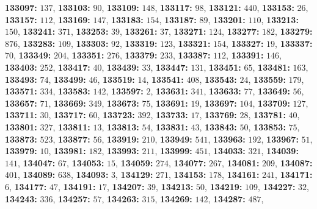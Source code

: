 \textsf{\bfseries 133097:} $137$, \textsf{\bfseries 133103:} $90$, \textsf{\bfseries 133109:} $148$, \textsf{\bfseries 133117:} $98$, \textsf{\bfseries 133121:} $440$, \textsf{\bfseries 133153:} $26$, \textsf{\bfseries 133157:} $112$, \textsf{\bfseries 133169:} $147$, \textsf{\bfseries 133183:} $154$, \textsf{\bfseries 133187:} $89$, \textsf{\bfseries 133201:} $110$, \textsf{\bfseries 133213:} $150$, \textsf{\bfseries 133241:} $371$, \textsf{\bfseries 133253:} $39$, \textsf{\bfseries 133261:} $37$, \textsf{\bfseries 133271:} $124$, \textsf{\bfseries 133277:} $182$, \textsf{\bfseries 133279:} $876$, \textsf{\bfseries 133283:} $109$, \textsf{\bfseries 133303:} $92$, \textsf{\bfseries 133319:} $123$, \textsf{\bfseries 133321:} $154$, \textsf{\bfseries 133327:} $19$, \textsf{\bfseries 133337:} $70$, \textsf{\bfseries 133349:} $204$, \textsf{\bfseries 133351:} $276$, \textsf{\bfseries 133379:} $233$, \textsf{\bfseries 133387:} $112$, \textsf{\bfseries 133391:} $146$, \textsf{\bfseries 133403:} $252$, \textsf{\bfseries 133417:} $40$, \textsf{\bfseries 133439:} $33$, \textsf{\bfseries 133447:} $131$, \textsf{\bfseries 133451:} $65$, \textsf{\bfseries 133481:} $163$, \textsf{\bfseries 133493:} $74$, \textsf{\bfseries 133499:} $46$, \textsf{\bfseries 133519:} $14$, \textsf{\bfseries 133541:} $408$, \textsf{\bfseries 133543:} $24$, \textsf{\bfseries 133559:} $179$, \textsf{\bfseries 133571:} $334$, \textsf{\bfseries 133583:} $142$, \textsf{\bfseries 133597:} $2$, \textsf{\bfseries 133631:} $341$, \textsf{\bfseries 133633:} $77$, \textsf{\bfseries 133649:} $56$, \textsf{\bfseries 133657:} $71$, \textsf{\bfseries 133669:} $349$, \textsf{\bfseries 133673:} $75$, \textsf{\bfseries 133691:} $19$, \textsf{\bfseries 133697:} $104$, \textsf{\bfseries 133709:} $127$, \textsf{\bfseries 133711:} $30$, \textsf{\bfseries 133717:} $60$, \textsf{\bfseries 133723:} $392$, \textsf{\bfseries 133733:} $17$, \textsf{\bfseries 133769:} $28$, \textsf{\bfseries 133781:} $40$, \textsf{\bfseries 133801:} $327$, \textsf{\bfseries 133811:} $13$, \textsf{\bfseries 133813:} $54$, \textsf{\bfseries 133831:} $43$, \textsf{\bfseries 133843:} $50$, \textsf{\bfseries 133853:} $75$, \textsf{\bfseries 133873:} $523$, \textsf{\bfseries 133877:} $56$, \textsf{\bfseries 133919:} $210$, \textsf{\bfseries 133949:} $541$, \textsf{\bfseries 133963:} $192$, \textsf{\bfseries 133967:} $51$, \textsf{\bfseries 133979:} $10$, \textsf{\bfseries 133981:} $182$, \textsf{\bfseries 133993:} $211$, \textsf{\bfseries 133999:} $451$, \textsf{\bfseries 134033:} $321$, \textsf{\bfseries 134039:} $141$, \textsf{\bfseries 134047:} $67$, \textsf{\bfseries 134053:} $15$, \textsf{\bfseries 134059:} $274$, \textsf{\bfseries 134077:} $267$, \textsf{\bfseries 134081:} $209$, \textsf{\bfseries 134087:} $401$, \textsf{\bfseries 134089:} $638$, \textsf{\bfseries 134093:} $3$, \textsf{\bfseries 134129:} $271$, \textsf{\bfseries 134153:} $178$, \textsf{\bfseries 134161:} $241$, \textsf{\bfseries 134171:} $6$, \textsf{\bfseries 134177:} $47$, \textsf{\bfseries 134191:} $17$, \textsf{\bfseries 134207:} $39$, \textsf{\bfseries 134213:} $50$, \textsf{\bfseries 134219:} $109$, \textsf{\bfseries 134227:} $32$, \textsf{\bfseries 134243:} $336$, \textsf{\bfseries 134257:} $57$, \textsf{\bfseries 134263:} $315$, \textsf{\bfseries 134269:} $142$, \textsf{\bfseries 134287:} $487$, 
